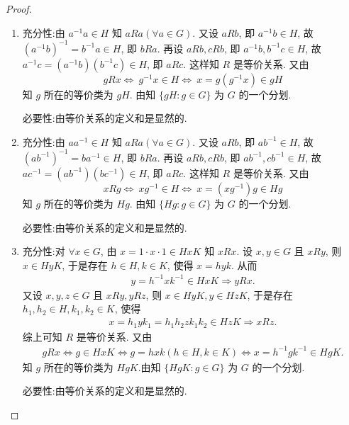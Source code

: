 \documentclass[../../main.tex]{subfiles}%
\begin{document}
\begin{proof}
\begin{enumerate}[(1)]
\item {\heiti 充分性:}由 \( a^{-1}a \in H \) 知 \( aRa(\forall a \in G) \). 又设 \( aRb \), 即 \( a^{-1}b \in H \), 故 \( (a^{-1}b)^{-1} = b^{-1}a \in H \), 即 \( bRa \). 再设 \( aRb, cRb \), 即 \( a^{-1}b, b^{-1}c \in H \), 故 \( a^{-1}c = (a^{-1}b)(b^{-1}c) \in H \), 即 \( aRc \). 这样知 \( R \) 是等价关系. 又由
\[
gRx \iff \ g^{-1}x \in H \iff \ x=g(g^{-1}x) \in gH
\]
知 \( g \) 所在的等价类为 \( gH \). 由知 \( \{gH:g\in G\} \) 为 \( G \) 的一个分划.

{\heiti 必要性:}由等价关系的定义和是显然的.

\item {\heiti 充分性:}由 \( aa^{-1} \in H \) 知 \( aRa(\forall a \in G) \). 又设 \( aRb \), 即 \( ab^{-1} \in H \), 故 \( (ab^{-1})^{-1} = ba^{-1} \in H \), 即 \( bRa \). 再设 \( aRb, cRb \), 即 \( ab^{-1}, cb^{-1} \in H \), 故 \( ac^{-1} = (ab^{-1})(bc^{-1}) \in H \), 即 \( aRc \). 这样知 \( R \) 是等价关系. 又由
\[
xRg \iff \ xg^{-1} \in H \iff \ x=(xg^{-1})g \in Hg
\]
知 \( g \) 所在的等价类为 \( Hg \). 由知 \( \{Hg:g\in G\} \) 为 \( G \) 的一个分划.

{\heiti 必要性:}由等价关系的定义和是显然的.

\item {\heiti 充分性:}对 $\forall x\in G$, 由 $x=1\cdot x\cdot 1\in HxK$ 知 $xRx$.
设 $x,y\in G$ 且 $xRy$, 则 $x\in HyK$, 于是存在 $h\in H,k\in K$, 使得 $x=hyk$. 从而
\begin{align*}
y=h^{-1}xk^{-1}\in HxK\Longrightarrow yRx.
\end{align*}
又设 $x,y,z\in G$ 且 $xRy,yRz$, 则 $x\in HyK,y\in HzK$, 于是存在 $h_1,h_2\in H,k_1,k_2\in K$, 使得
\begin{align*}
x=h_1yk_1=h_1h_2zk_1k_2\in HzK\Longrightarrow xRz.
\end{align*}
综上可知 $R$ 是等价关系. 又由
\begin{align*}
gRx\Longleftrightarrow g\in HxK\Longleftrightarrow g=hxk\left( h\in H,k\in K \right) \Longleftrightarrow x=h^{-1}gk^{-1}\in HgK.
\end{align*}
知 $g$ 所在的等价类为 $HgK$.由知 \( \{HgK:g\in G\} \) 为 \( G \) 的一个分划.

{\heiti 必要性:}由等价关系的定义和是显然的.
\end{enumerate}

\end{proof}
\end{document}
